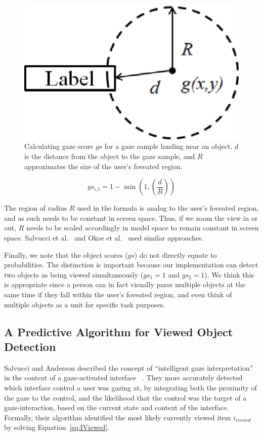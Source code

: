 \begin{figure}[htb]
  \centering
  \includegraphics[width=0.6\linewidth]{images/gazeScoreFig3.eps}
  \caption{Calculating gaze score $gs$ for a gaze sample landing near an object. $d$ is the distance from the object to the gaze sample, and $R$ approximates the size of the user's foveated region.}
	\label{fig:gazeScoreFig3}
\end{figure}

\begin{equation}
gs_{i,t} = 1 - \min (1, (\frac{d}{R}))
\label{eq:GS}
\end{equation}

The region of radius $R$ used in the formula is analog to the user's foveated region, and as such needs to be constant in screen space. Thus, if we zoom the view in or out, $R$ needs to be scaled accordingly in model space to remain constant in screen space.  Salvucci et al.~\cite{Sal00} and Okoe et al.~\cite{Okoe14} used similar approaches.

Finally, we note that the object scores ($gs$) do not directly equate to probabilities. The distinction is important because our implementation can detect two objects as being viewed simultaneously ($gs_1 = 1$ and $gs_2=1$). We think this is appropriate since a person can in fact visually parse multiple objects at the same time if they fall within the user's foveated region, and even think of multiple objects as a unit for specific task purposes.



\subsection{A Predictive Algorithm for Viewed Object Detection}
\label{sec:MehthodsIntelligentAlgorithm}

Salvucci and Anderson described the concept of ``intelligent gaze interpretation'' in the context of a gaze-activated interface ~\cite{Sal00}. They more accurately detected which interface control a user was gazing at, by integrating both the proximity of the gaze to the control, and the likelihood that the control was the target of a gaze-interaction, based on the current state and context of the interface. Formally, their algorithm identified the most likely currently viewed item $i_{viewed}$ by solving Equation~\ref{eq:IViewed}.

